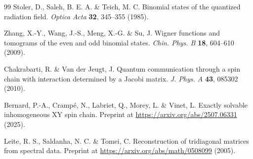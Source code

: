 \documentclass[12pt]{article}
\begin{document}
\begin{thebibliography}{99}
Stoler, D., Saleh, B. E. A. \& Teich, M. C. Binomial states of the
quantized radiation field. \textit{Optica Acta} \textbf{32}, 345--355
(1985).

Zhang, X.-Y., Wang, J.-S., Meng, X.-G. \& Su, J. Wigner functions and
tomograms of the even and odd binomial states. \textit{Chin. Phys. B}
\textbf{18}, 604--610 (2009).

Chakrabarti, R. \& Van der Jeugt, J. Quantum communication through a spin
chain with interaction determined by a Jacobi matrix.
\textit{J. Phys. A} \textbf{43}, 085302 (2010).

Bernard, P.-A., Cramp\'e, N., Labriet, Q., Morey, L. \& Vinet, L.
Exactly solvable inhomogeneous XY spin chain. Preprint at
\url{https://arxiv.org/abs/2507.06331} (2025).

Leite, R. S., Saldanha, N. C. \& Tomei, C. Reconstruction of tridiagonal
matrices from spectral data. Preprint at
\url{https://arxiv.org/abs/math/0508099} (2005).

\end{thebibliography}
\end{document}
